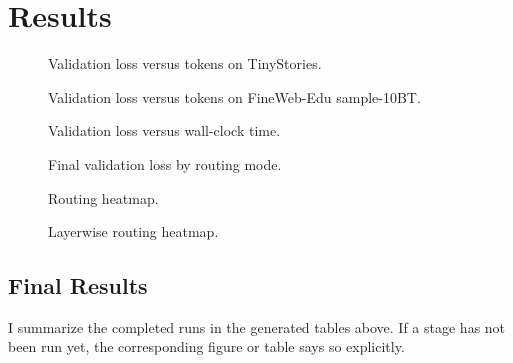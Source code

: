 \section{Results}

\begin{figure}[ht]
\centering
{}
\caption{Validation loss versus tokens on TinyStories.}
\end{figure}

\begin{figure}[ht]
\centering
{}
\caption{Validation loss versus tokens on FineWeb-Edu sample-10BT.}
\end{figure}

\begin{figure}[ht]
\centering
{}
\caption{Validation loss versus wall-clock time.}
\end{figure}

\begin{figure}[ht]
\centering
{}
\caption{Final validation loss by routing mode.}
\end{figure}

\begin{figure}[ht]
\centering
{}
\caption{Routing heatmap.}
\end{figure}

\begin{figure}[ht]
\centering
{}
\caption{Layerwise routing heatmap.}
\end{figure}

\FloatBarrier

\subsection{Final Results}

I summarize the completed runs in the generated tables above. If a stage has not been run yet, the corresponding figure or table says so explicitly.
